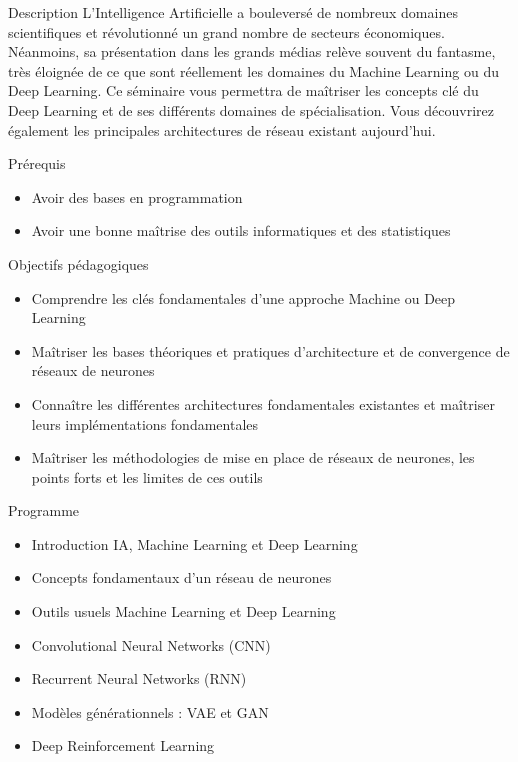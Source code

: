 
\begin{frame}{Description}
  L'Intelligence Artificielle a bouleversé de nombreux domaines scientifiques et révolutionné un grand nombre de secteurs économiques.
  Néanmoins, sa présentation dans les grands médias relève souvent du fantasme, très éloignée de ce que sont réellement les domaines du Machine Learning ou du Deep Learning.
  Ce séminaire vous permettra de maîtriser les concepts clé du Deep Learning et de ses différents domaines de spécialisation.
  Vous découvrirez également les principales architectures de réseau existant aujourd'hui.
\end{frame}

\begin{frame}{Prérequis}
  \begin{itemize}
    \item Avoir des bases en programmation
    \item Avoir une bonne maîtrise des outils informatiques et des statistiques
  \end{itemize}
\end{frame}

\begin{frame}{Objectifs pédagogiques}
  \begin{itemize}
    \item Comprendre les clés fondamentales d'une approche Machine ou Deep Learning
    \item Maîtriser les bases théoriques et pratiques d'architecture et de convergence de réseaux de neurones
    \item Connaître les différentes architectures fondamentales existantes et maîtriser leurs implémentations fondamentales
    \item Maîtriser les méthodologies de mise en place de réseaux de neurones, les points forts et les limites de ces outils
  \end{itemize}
\end{frame}

\begin{frame}{Programme}
  \begin{itemize}
    \item Introduction IA, Machine Learning et Deep Learning
    \item Concepts fondamentaux d'un réseau de neurones
    \item Outils usuels Machine Learning et Deep Learning
    \item Convolutional Neural Networks (CNN)
    \item Recurrent Neural Networks (RNN)
    \item Modèles générationnels : VAE et GAN
    \item Deep Reinforcement Learning
  \end{itemize}
\end{frame}
